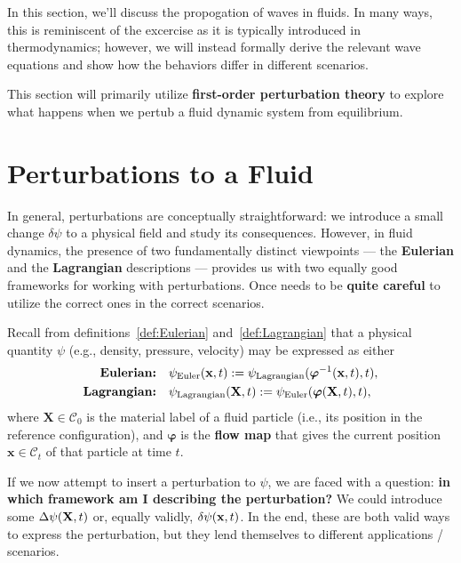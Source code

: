 In this section, we'll discuss the propogation of waves in fluids. In many ways, this is reminiscent of the excercise as it is typically introduced in thermodynamics; however, we will instead formally derive the relevant wave equations and show how the behaviors differ in different scenarios.

This section will primarily utilize \textbf{first-order perturbation theory} to explore what happens when we pertub a fluid dynamic system from equilibrium.

\section{Perturbations to a Fluid}

In general, perturbations are conceptually straightforward: we introduce a small change \( \delta \psi \) to a physical field and study its consequences. However, in fluid dynamics, the presence of two fundamentally distinct viewpoints --- the \textbf{Eulerian} and the \textbf{Lagrangian} descriptions --- provides us with two equally good frameworks for working with perturbations. Once needs to be \textbf{quite careful} to utilize the correct ones in the correct scenarios.

Recall from definitions~\ref{def:Eulerian} and~\ref{def:Lagrangian} that a physical quantity \( \psi \) (e.g., density, pressure, velocity) may be expressed as either
\[
\begin{aligned}
    \textbf{Eulerian:} \quad & \psi_{\rm Euler}(\mathbf{x}, t) := \psi_{\rm Lagrangian}(\boldsymbol{\varphi}^{-1}({\bf x},t),t), \\
    \textbf{Lagrangian:} \quad & \psi_{\rm Lagrangian}(\mathbf{X}, t) := \psi_{\rm Euler}(\boldsymbol{\varphi}(\mathbf{X}, t), t),
\end{aligned}
\]
where \( \mathbf{X} \in \mathcal{C}_0 \) is the material label of a fluid particle (i.e., its position in the reference configuration), and \( \boldsymbol{\varphi} \) is the \textbf{flow map} that gives the current position \( \mathbf{x} \in \mathcal{C}_t \) of that particle at time \( t \).

If we now attempt to insert a perturbation to $\psi$, we are faced with a question: \textbf{in which framework am I describing the perturbation?} We could introduce some $\Delta \psi({\bf X},t)$ or, equally validly, $\delta \psi({\bf x},t)$. In the end, these are both valid ways to express the perturbation, but they lend themselves to different applications / scenarios. 

